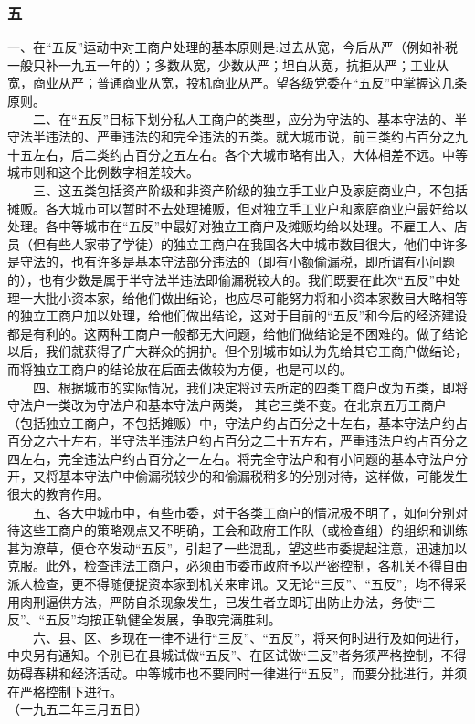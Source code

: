 \documentclass[cn,11pt,chinese]{elegantbook}
\def\myformat#1{\hfil\hfil #1}
\begin{document}
\subsubsection*{\myformat{五}}
一、在“五反”运动中对工商户处理的基本原则是:过去从宽，今后从严（例如补税一般只补一九五一年的）；多数从宽，少数从严；坦白从宽，抗拒从严；工业从宽，商业从严；普通商业从宽，投机商业从严。望各级党委在“五反”中掌握这几条原则。\\
　　二、在“五反”目标下划分私人工商户的类型，应分为守法的、基本守法的、半守法半违法的、严重违法的和完全违法的五类。就大城市说，前三类约占百分之九十五左右，后二类约占百分之五左右。各个大城市略有出入，大体相差不远。中等城市则和这个比例数字相差较大。\\
　　三、这五类包括资产阶级和非资产阶级的独立手工业户及家庭商业户，不包括摊贩。各大城市可以暂时不去处理摊贩，但对独立手工业户和家庭商业户最好给以处理。各中等城市在“五反”中最好对独立工商户及摊贩均给以处理。不雇工人、店员（但有些人家带了学徒）的独立工商户在我国各大中城市数目很大，他们中许多是守法的，也有许多是基本守法部分违法的（即有小额偷漏税，即所谓有小问题的），也有少数是属于半守法半违法即偷漏税较大的。我们既要在此次“五反”中处理一大批小资本家，给他们做出结论，也应尽可能努力将和小资本家数目大略相等的独立工商户加以处理，给他们做出结论，这对于目前的“五反”和今后的经济建设都是有利的。这两种工商户一般都无大问题，给他们做结论是不困难的。做了结论以后，我们就获得了广大群众的拥护。但个别城市如认为先给其它工商户做结论，而将独立工商户的结论放在后面去做较为方便，也是可以的。\\
　　四、根据城市的实际情况，我们决定将过去所定的四类工商户改为五类，即将守法户一类改为守法户和基本守法户两类， 其它三类不变。在北京五万工商户（包括独立工商户，不包括摊贩）中，守法户约占百分之十左右，基本守法户约占百分之六十左右，半守法半违法户约占百分之二十五左右，严重违法户约占百分之四左右，完全违法户约占百分之一左右。将完全守法户和有小问题的基本守法户分开，又将基本守法户中偷漏税较少的和偷漏税稍多的分别对待，这样做，可能发生很大的教育作用。\\
　　五、各大中城市中，有些市委，对于各类工商户的情况极不明了，如何分别对待这些工商户的策略观点又不明确，工会和政府工作队（或检查组）的组织和训练甚为潦草，便仓卒发动“五反”，引起了一些混乱，望这些市委提起注意，迅速加以克服。此外，检查违法工商户，必须由市委市政府予以严密控制，各机关不得自由派人检查，更不得随便捉资本家到机关来审讯。又无论“三反”、“五反”，均不得采用肉刑逼供方法，严防自杀现象发生，已发生者立即订出防止办法，务使“三反”、“五反”均按正轨健全发展，争取完满胜利。\\
　　六、县、区、乡现在一律不进行“三反”、“五反”，将来何时进行及如何进行，中央另有通知。个别已在县城试做“五反”、在区试做“三反”者务须严格控制，不得妨碍春耕和经济活动。中等城市也不要同时一律进行“五反”，而要分批进行，并须在严格控制下进行。\\
（一九五二年三月五日）\\
\end{document}
